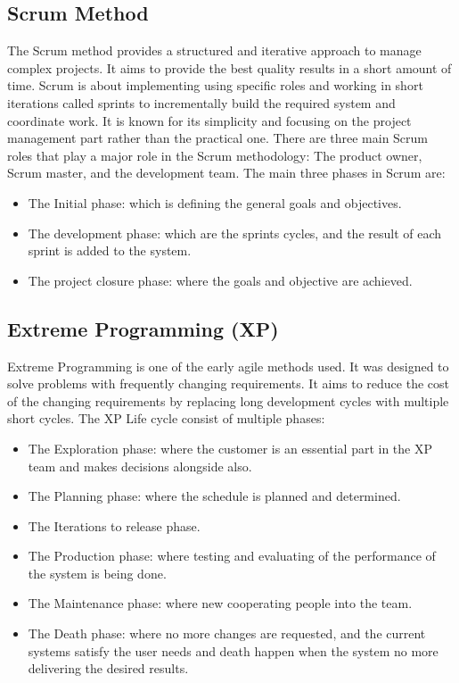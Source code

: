 \documentclass[article,onecolumn]{IEEEtran}
\begin{document}
\subsection{Scrum Method}
The Scrum method provides a structured and iterative approach to manage complex projects. It aims to provide the best quality results in a short amount of time. Scrum is about implementing using specific roles and working in short iterations called sprints to incrementally build the required system and coordinate work. It is known for its simplicity and focusing on the project management part rather than the practical one. There are three main Scrum roles that play a major role in the Scrum methodology: The product owner, Scrum master, and the development team.
The main three phases in Scrum are:

\begin{itemize}
	\item The Initial phase: which is defining the general goals and objectives.
	\item The development phase: which are the sprints cycles, and the result of each sprint is added to the system.
	\item The project closure phase: where the goals and objective are achieved.
\end{itemize}

\subsection{Extreme Programming (XP)}
Extreme Programming is one of the early agile methods used. It was designed to solve problems with frequently changing requirements. It aims to reduce the cost of the changing requirements by replacing long development cycles with multiple short cycles. The XP Life cycle consist of multiple phases:

\begin{itemize}
	\item The Exploration phase: where the customer is an essential part in the XP team and makes decisions alongside also.
	\item The Planning phase: where the schedule is planned and determined.
	\item The Iterations to release phase.
	\item The Production phase: where testing and evaluating of the performance of the system is being done.
	\item The Maintenance phase: where new cooperating people into the team.
	\item The Death phase: where no more changes are requested, and the current systems satisfy the user needs and death happen when the system no more delivering the desired results.
\end{itemize}
\end{document}
